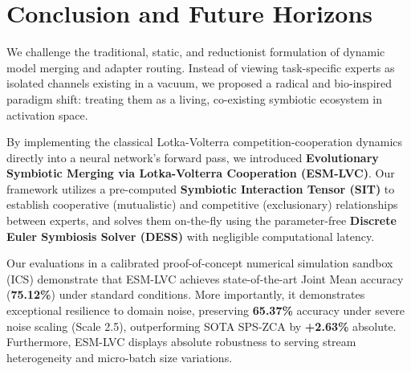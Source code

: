 \section{Conclusion and Future Horizons}
\label{sec:conclusion}

We challenge the traditional, static, and reductionist formulation of dynamic model merging and adapter routing. Instead of viewing task-specific experts as isolated channels existing in a vacuum, we proposed a radical and bio-inspired paradigm shift: treating them as a living, co-existing symbiotic ecosystem in activation space.

By implementing the classical Lotka-Volterra competition-cooperation dynamics directly into a neural network's forward pass, we introduced \textbf{Evolutionary Symbiotic Merging via Lotka-Volterra Cooperation (ESM-LVC)}. Our framework utilizes a pre-computed \textbf{Symbiotic Interaction Tensor (SIT)} to establish cooperative (mutualistic) and competitive (exclusionary) relationships between experts, and solves them on-the-fly using the parameter-free \textbf{Discrete Euler Symbiosis Solver (DESS)} with negligible computational latency.

Our evaluations in a calibrated proof-of-concept numerical simulation sandbox (ICS) demonstrate that ESM-LVC achieves state-of-the-art Joint Mean accuracy (\textbf{75.12\%}) under standard conditions. More importantly, it demonstrates exceptional resilience to domain noise, preserving \textbf{65.37\%} accuracy under severe noise scaling (Scale 2.5), outperforming SOTA SPS-ZCA by \textbf{+2.63\%} absolute. Furthermore, ESM-LVC displays absolute robustness to serving stream heterogeneity and micro-batch size variations.

